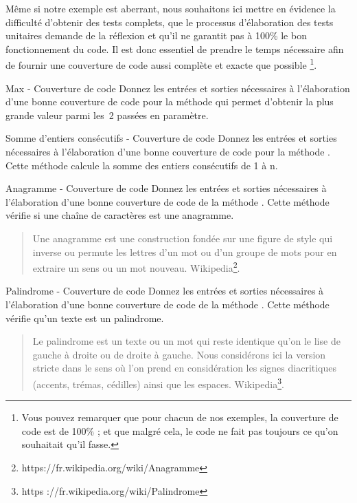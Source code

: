\documentclass[a4paper,11pt]{style-esi/td}
\begin{document}
Même si notre exemple est aberrant,
nous souhaitons ici mettre en évidence la difficulté d'obtenir des tests complets,
que le processus d’élaboration des tests unitaires demande de la réflexion
et qu’il ne garantit pas à 100\% le bon fonctionnement du code.
Il est donc essentiel de prendre le temps nécessaire
afin de fournir une couverture de code aussi complète et exacte que possible%
\footnote{%
	Vous pouvez remarquer que pour chacun de nos exemples,
	la couverture de code est de 100\% ;
	et que malgré cela, le code ne fait pas toujours ce qu'on souhaitait qu'il fasse.
}.

\begin{Exercice}{Max - Couverture de code}
	Donnez les entrées et sorties nécessaires à l’élaboration d’une bonne
	couverture de code pour la méthode  qui
	permet d’obtenir la plus grande valeur parmi les~2 passées en
	paramètre.
\end{Exercice}

\begin{Exercice}{Somme d'entiers consécutifs - Couverture de code}
	Donnez les entrées et sorties nécessaires à l’élaboration d’une bonne couverture de code pour la méthode . Cette méthode calcule la somme des entiers consécutifs de 1 à n.
\end{Exercice}

\begin{Exercice}{Anagramme - Couverture de code}
	Donnez les entrées et sorties nécessaires à l’élaboration d’une bonne couverture de code de la méthode . Cette méthode vérifie si une chaîne de caractères est une anagramme.
	\begin{quote}
		\og Une anagramme est une construction fondée sur une figure de style qui inverse ou permute les lettres d’un mot ou d’un groupe de mots pour en extraire un sens ou un mot nouveau.\fg
		Wikipedia\footnote{https://fr.wikipedia.org/wiki/Anagramme}.
	\end{quote}
\end{Exercice}

\begin{Exercice}{Palindrome - Couverture de code}
	Donnez les entrées et sorties nécessaires à l’élaboration d’une bonne couverture de code de la méthode . Cette méthode vérifie qu'un texte est un palindrome.
	\begin{quote}
		\og Le palindrome est un texte ou un mot qui reste identique qu’on le lise de gauche à droite ou de droite à gauche. Nous considérons ici la version stricte dans le sens où l’on prend en considération les signes diacritiques (accents, trémas, cédilles) ainsi que les espaces.\fg{} Wikipedia\footnote{https ://fr.wikipedia.org/wiki/Palindrome}.
	\end{quote}
\end{Exercice}
\end{document}
